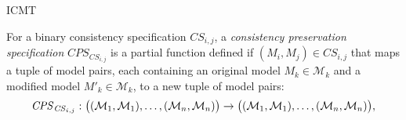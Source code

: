\begin{copiedFrom}{ICMT}
\begin{definition}
\label{def:consistency_preservation_specification}
For a binary consistency specification $\mathit{CS}_{i, j}$, a \emph{consistency preservation specification} $\mathit{CPS}_{\mathit{CS}_{i,j}}$ is a partial function defined if $(M_i, M_j) \in \mathit{CS}_{i,j}$
that maps a tuple of model pairs, each containing an original model $M_k \in \mathcal{M}_k$ and a modified model $M'_k \in \mathcal{M}_k$, to a new tuple of model pairs:
\begin{align*}
    \mathit{CPS}_{\mathit{CS}_{i,j}}: \hspace{0.3em} & \big( (\mathcal{M}_1, \mathcal{M}_1), \ldots, (\mathcal{M}_n, \mathcal{M}_n) \big) \rightarrow \big( (\mathcal{M}_1, \mathcal{M}_1), \ldots, (\mathcal{M}_n, \mathcal{M}_n) \big), \\[0.5em]

\end{align*}
\end{definition}
\end{copiedFrom}
